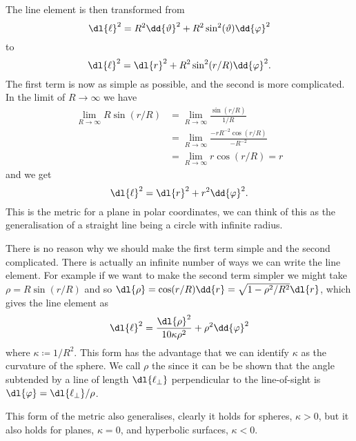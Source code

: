 \documentclass[fleqn]{NotesClass}
\begin{document}
    The line element is then transformed from
    \begin{equation}
        \dl{\ell}^2 = R^2\dd{\vartheta}^2 + R^2\sin^2(\vartheta)\dd{\varphi}^2
    \end{equation}
    to
    \begin{equation}
        \dl{\ell}^2 = \dl{r}^2 + R^2\sin^2(r/R)\dd{\varphi}^2.
    \end{equation}
    The first term is now as simple as possible, and the second is more complicated.
    In the limit of \(R \to \infty\) we have
    \begin{align}
        \lim_{R \to \infty} R\sin(r/R) &= \lim_{R \to \infty} \frac{\sin(r/R)}{1/R}\\
        &= \lim_{R\to\infty} \frac{-rR^{-2}\cos(r/R)}{-R^{-2}}\\
        &= \lim_{R \to \infty} r\cos(r/R) = r
    \end{align}
    and we get
    \begin{equation}
        \dl{\ell}^2 = \dl{r}^2 + r^2\dd{\varphi}^2.
    \end{equation}
    This is the metric for a plane in polar coordinates, we can think of this as the generalisation of a straight line being a circle with infinite radius.
    
    There is no reason why we should make the first term simple and the second complicated.
    There is actually an infinite number of ways we can write the line element.
    For example if we want to make the second term simpler we might take \(\rho = R\sin(r/R)\) and so \(\dl{\rho} = \cos(r/R)\dd{r} = \sqrt{1 - \rho^2/R^2}\dl{r}\), which gives the line element as
    \begin{equation}
        \dl{\ell}^2 = \frac{\dl{\rho}^2}{1 0 \kappa \rho^2} + \rho^2 \dd{\varphi}^2
    \end{equation}
    where \(\kappa \coloneqq 1/R^2\).
    This form has the advantage that we can identify \(\kappa\) as the curvature of the sphere.
    We call \(\rho\) the  since it can be be shown that the angle subtended by a line of length \(\dl{\ell_\perp}\) perpendicular to the line-of-sight is \(\dl{\varphi} = \dl{\ell_\perp}/\rho\).
    
    This form of the metric also generalises, clearly it holds for spheres, \(\kappa > 0\), but it also holds for planes, \(\kappa = 0\), and hyperbolic surfaces, \(\kappa < 0\).
    
\end{document}
